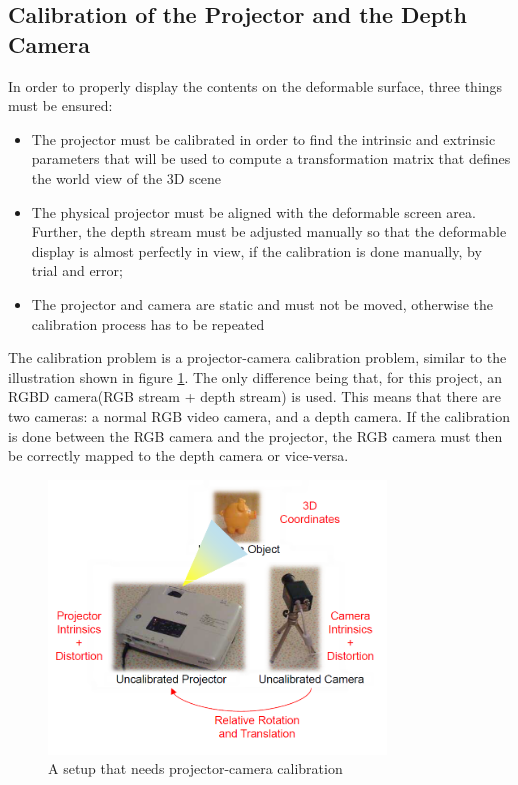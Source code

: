\documentclass[]{article}
\begin{document}
\subsection{Calibration of the Projector and the Depth Camera}

In order to properly display the contents on the deformable surface, three things must be ensured:
\begin{itemize}
\item The projector must be calibrated in order to find the intrinsic and extrinsic parameters that will be used to compute a transformation matrix that defines the world view of the 3D scene
\item The physical projector must be aligned with the deformable screen area. Further, the depth stream must be adjusted manually so that the deformable display is almost perfectly in view, if the calibration is done manually, by trial and error; 
\item The projector and camera are static and must not be moved, otherwise the calibration process has to be repeated\\
\end{itemize}

The calibration problem is a projector-camera calibration problem, similar to the illustration shown in figure \ref{fig:ProjectorCameraSetup}. The only difference being that, for this project, an RGBD camera(RGB stream + depth stream) is used. This means that there are two cameras: a normal RGB video camera, and a depth camera. If the calibration is done between the RGB camera and the projector, the RGB camera must then be correctly mapped to the depth camera or vice-versa.

\begin{figure}[hbtp]
    \centering
    \includegraphics[width=0.8\textwidth]{figures/Projector-Camera_Calibration.PNG}
    \caption{A setup that needs projector-camera calibration}
    \label{fig:ProjectorCameraSetup}
\end{figure}
\end{document}
